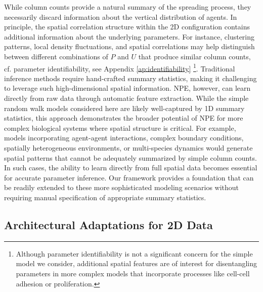 \documentclass{article}
\begin{document}
While column counts provide a natural summary of the spreading process, they necessarily discard information about the vertical distribution of agents. In principle, the spatial correlation structure within the 2D configuration contains additional information about the underlying parameters. For instance, clustering patterns, local density fluctuations, and spatial correlations may help distinguish between different combinations of $P$ and $U$ that produce similar column counts, cf. parameter identifiability, see Appendix \ref{ap:identifiability} \footnote{Although parameter identifiability is not a significant concern for the simple model we consider, additional spatial features are of interest for disentangling parameters in more complex models that incorporate processes like cell-cell adhesion or proliferation.}. Traditional inference methods require hand-crafted summary statistics, making it challenging to leverage such high-dimensional spatial information. NPE, however, can learn directly from raw data through automatic feature extraction. While the simple random walk models considered here are likely well-captured by 1D summary statistics, this approach demonstrates the broader potential of NPE for more complex biological systems where spatial structure is critical. For example, models incorporating agent-agent interactions, complex boundary conditions, spatially heterogeneous environments, or multi-species dynamics would generate spatial patterns that cannot be adequately summarized by simple column counts. In such cases, the ability to learn directly from full spatial data becomes essential for accurate parameter inference. Our framework provides a foundation that can be readily extended to these more sophisticated modeling scenarios without requiring manual specification of appropriate summary statistics.

\subsection{Architectural Adaptations for 2D Data}
\end{document}
